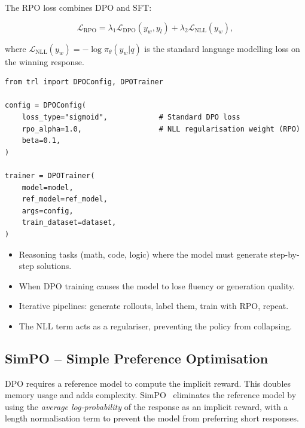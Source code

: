 The RPO loss combines DPO and SFT:

\[
\mathcal{L}_{\text{RPO}} =
    \lambda_1 \mathcal{L}_{\text{DPO}}(y_w, y_l)
    + \lambda_2 \mathcal{L}_{\text{NLL}}(y_w),
\]

where $\mathcal{L}_{\text{NLL}}(y_w) = -\log \pi_\theta(y_w|q)$ is the standard language modelling loss on the winning response.

\begin{examplebox}
\begin{lstlisting}[style=pythonstyle]
from trl import DPOConfig, DPOTrainer

config = DPOConfig(
    loss_type="sigmoid",            # Standard DPO loss
    rpo_alpha=1.0,                  # NLL regularisation weight (RPO)
    beta=0.1,
)

trainer = DPOTrainer(
    model=model,
    ref_model=ref_model,
    args=config,
    train_dataset=dataset,
)
\end{lstlisting}
\end{examplebox}

\begin{keybox}
\begin{itemize}
  \item Reasoning tasks (math, code, logic) where the model must generate step-by-step solutions.
  \item When DPO training causes the model to lose fluency or generation quality.
  \item Iterative pipelines: generate rollouts, label them, train with RPO, repeat.
  \item The NLL term acts as a regulariser, preventing the policy from collapsing.
\end{itemize}
\end{keybox}

\subsection{SimPO -- Simple Preference Optimisation}
\label{sec:simpo}

\begin{intuitionbox}
DPO requires a reference model to compute the implicit reward. This doubles memory usage and adds complexity. SimPO~\cite{meng2024simpo} eliminates the reference model by using the \emph{average log-probability} of the response as an implicit reward, with a length normalisation term to prevent the model from preferring short responses.
\end{intuitionbox}

